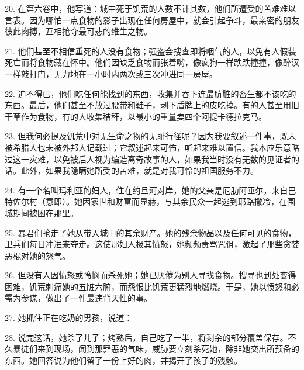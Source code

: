 20. 在第六卷中，他写道：城中死于饥荒的人数不计其数，他们所遭受的苦难难以言表。因为哪怕一点食物的影子出现在任何房屋中，就会引起争斗，最亲密的朋友彼此肉搏，互相抢夺最可悲的维生之物。\par

21. 他们甚至不相信垂死的人没有食物；强盗会搜查即将咽气的人，以免有人假装死亡而将食物藏在怀中。他们因缺乏食物而张着嘴，像疯狗一样跌跌撞撞，像醉汉一样敲打门，无力地在一小时内两次或三次冲进同一房屋。\par

22. 迫不得已，他们吃任何能找到的东西，收集并吞下连最肮脏的畜生都不该吃的东西。最后，他们甚至不放过腰带和鞋子，剥下盾牌上的皮吃掉。有的人甚至用旧干草作为食物，有的人收集秸秆，以最小的重量卖四个阿提卡德拉克马。\par

23. 但我何必提及饥荒中对无生命之物的无耻行径呢？因为我要叙述一件事，既未被希腊人也未被外邦人记载过；它叙述起来可怖，听起来难以置信。我本应乐意略过这一灾难，以免被后人视为编造离奇故事的人，如果我当时没有无数的见证者的话。此外，如果我隐瞒她所受的苦难，就是对我可怜的祖国服务不力。\par

24. 有一个名叫玛利亚的妇人，住在约旦河对岸，她的父亲是厄肋阿匝尔，来自巴特佐尔村（意即）。她因家世和财富而显赫，与其余民众一起逃到耶路撒冷，在围城期间被困在那里。\par

25. 暴君们抢走了她从带入城中的其余财产。她的残余物品以及任何可见的食物，卫兵们每日冲进来夺走。这使那妇人极其愤怒，她频频责骂咒诅，激起了那些贪婪恶棍对她的怒气。\par

26. 但没有人因愤怒或怜悯而杀死她；她已厌倦为别人寻找食物。搜寻也到处变得困难，饥荒刺痛她的五脏六腑，而怨恨比饥荒更猛烈地燃烧。于是，她以愤怒和必需为参谋，做出了一件最违背天性的事。\par

27. 她抓住正在吃奶的男孩，说道：\par

28. 说完这话，她杀了儿子；烤熟后，自己吃了一半，将剩余的部分覆盖保存。不久暴徒们来到现场，闻到那罪恶的气味，威胁要立刻杀死她，除非她交出所预备的东西。她回答说为他们留了一份上好的肉，并揭开了孩子的残骸。\par

